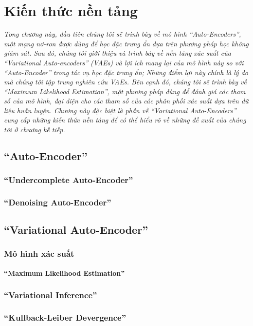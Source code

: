 \chapter{Kiến thức nền tảng}
\label{Chapter2}
\textit{Tong chương này, đầu tiên chúng tôi sẽ trình bày về mô hình 
``Auto-Encoders'', một mạng nơ-ron được dùng để học đặc trưng ẩn dựa trên
phương pháp học không giám sát.
Sau đó, chúng tôi giới thiệu và trình bày về nền tảng xác suất 
của ``Variational Auto-encoders'' (VAEs) và lợi ích mang lại của 
mô hình này so với ``Auto-Encoder'' trong tác vụ học đặc trưng ẩn; 
Những điểm lợi này chính là lý do mà chúng tôi tập trung nghiên cứu VAEs. 
Bên cạnh đó, chúng tôi sẽ trình bày về ``Maximum Likelihood Estimation'', 
một phương pháp dùng để đánh giá các tham số của mô hình, đại diện cho các tham số 
của các phân phối xác suất dựa trên dữ liệu huấn luyện. 
Chương này đặc biệt là phần về ``Variational Auto-Encoders'' 
cung cấp những kiến thức nền tảng để có thể hiểu rõ về những đề xuất 
của chúng tôi ở chương kế tiếp.}



\section{``Auto-Encoder''}
    \subsection{``Undercomplete Auto-Encoder''}
    \subsection{``Denoising Auto-Encoder''}

\section{``Variational Auto-Encoder''}
    \subsection{Mô hình xác suất}
        \subsubsection{``Maximum Likelihood Estimation''}
    \subsection{``Variational Inference''}
    \subsection{``Kullback-Leiber Devergence''}
